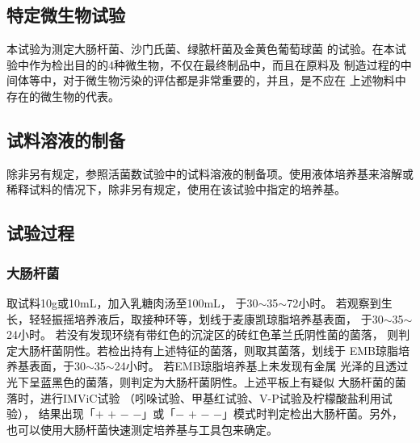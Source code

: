 \documentclass[11pt,a4paper]{article}
\newenvironment{SC}{%
  \CJKfamily{gbsn}%
  \CJKtilde
  \CJKnospace}{}
\begin{document}
\begin{CJK}{UTF8}{}
\begin{SC}
\section{特定微生物试验}
本试验为测定大肠杆菌、沙门氏菌、绿脓杆菌及金黄色葡萄球菌
的试验。在本试验中作为检出目的的4种微生物，不仅在最终制品中，而且在原料及
制造过程的中间体等中，对于微生物污染的评估都是非常重要的，并且，是不应在
上述物料中存在的微生物的代表。\endnote{}

\subsection*{试料溶液的制备}
除非另有规定，参照活菌数试验中的试料溶液的制备项。使用液体培养基来溶解或
稀释试料的情况下，除非另有规定，使用在该试验中指定的培养基。

\subsection*{试验过程}
\setcounter{subsubsection}{0}
\subsubsection{大肠杆菌\endnote{}}
取试料10g或10mL，加入乳糖肉汤至100mL，
于30$\sim$35$\sim$72小时。
若观察到生长，轻轻振摇培养液后，取接种环等，划线于麦康凯琼脂培养基表面，
于30$\sim$35$\sim$24小时。
若没有发现环绕有带红色的沉淀区的砖红色革兰氏阴性菌的菌落，
则判定大肠杆菌阴性。若检出持有上述特征的菌落，则取其菌落，划线于
EMB琼脂培养基表面，于30$\sim$35$\sim$24小时。
若EMB琼脂培养基上未发现有金属
光泽的且透过光下呈蓝黑色的菌落，则判定为大肠杆菌阴性。上述平板上有疑似
大肠杆菌的菌落时，进行IMViC试验\endnote{}
（吲哚试验、甲基红试验、V-P试验及柠檬酸盐利用试验），
结果出现「$+$ $+$ $-$ $-$」或「$-$ $+$ $-$ $-$」模式时判定检出大肠杆菌。另外，
也可以使用大肠杆菌快速测定培养基与工具包来确定。

\end{SC}
\end{CJK}
\end{document}
